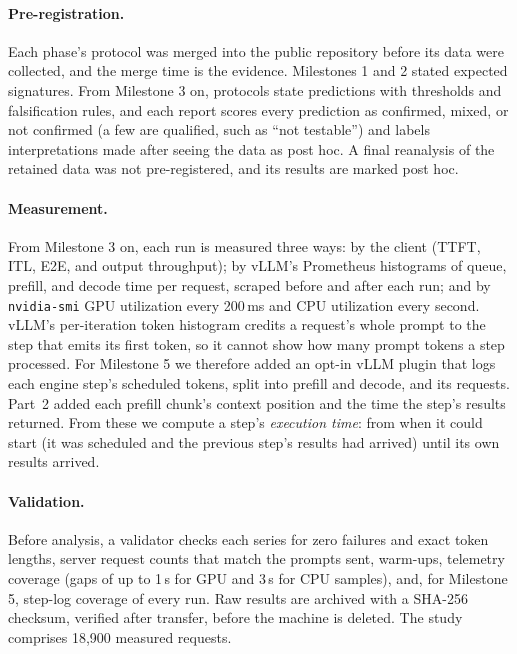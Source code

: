 \paragraph{Pre-registration.}
Each phase's protocol was merged into the public repository before its data were
collected, and the merge time is the evidence. Milestones 1 and 2 stated expected
signatures. From Milestone 3 on, protocols state predictions with thresholds and
falsification rules, and each report scores every prediction as confirmed, mixed, or
not confirmed (a few are qualified, such as ``not testable'') and labels
interpretations made after seeing the data as post hoc. A final reanalysis of the
retained data was not pre-registered, and its results are marked post hoc.

\paragraph{Measurement.}
From Milestone 3 on, each run is measured three ways: by the client (TTFT, ITL, E2E,
and output throughput); by vLLM's Prometheus histograms of queue, prefill, and decode
time per request, scraped before and after each run; and by \texttt{nvidia-smi} GPU
utilization every 200\,ms and CPU utilization every second. vLLM's per-iteration token
histogram credits a request's whole prompt to the step that emits its first token, so
it cannot show how many prompt tokens a step processed. For Milestone 5 we therefore
added an opt-in vLLM plugin that logs each engine step's scheduled tokens, split into
prefill and decode, and its requests. Part~2 added each prefill chunk's context
position and the time the step's results returned. From these we compute a step's
\emph{execution time}: from when it could start (it was scheduled and the previous
step's results had arrived) until its own results arrived.

\paragraph{Validation.}
Before analysis, a validator checks each series for zero failures and exact token
lengths, server request counts that match the prompts sent, warm-ups, telemetry
coverage (gaps of up to 1\,s for GPU and 3\,s for CPU samples), and, for Milestone 5,
step-log coverage of every run. Raw results are archived with a SHA-256 checksum,
verified after transfer, before the machine is deleted. The study comprises 18{,}900
measured requests.
